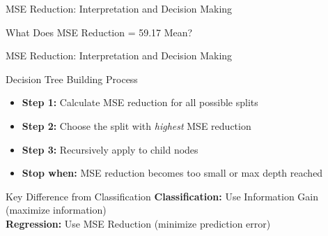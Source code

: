 \documentclass[usenames,dvipsnames]{beamer}
\begin{document}
\begin{frame}{MSE Reduction: Interpretation and Decision Making}
\scriptsize
\begin{keypointsbox}{What Does MSE Reduction = 59.17 Mean?}
\end{keypointsbox}
\end{frame}

\begin{frame}{MSE Reduction: Interpretation and Decision Making}
\small
\begin{examplebox}{Decision Tree Building Process}
\begin{itemize}[<*>]
    \item \textbf{Step 1:} Calculate MSE reduction for all possible splits
    \item \textbf{Step 2:} Choose the split with \emph{highest} MSE reduction
    \item \textbf{Step 3:} Recursively apply to child nodes
    \item \textbf{Stop when:} MSE reduction becomes too small or max depth reached
\end{itemize}
\end{examplebox}

\pause
\begin{alertbox}{Key Difference from Classification}
\textbf{Classification:} Use Information Gain (maximize information)\\
\textbf{Regression:} Use MSE Reduction (minimize prediction error)
\end{alertbox}
\end{frame}
\end{document}
